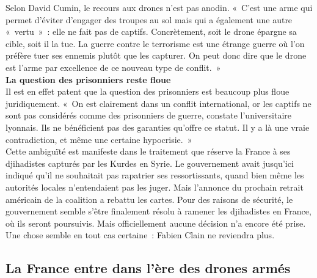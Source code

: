 \documentclass[8pt]{article}
\begin{document}
Selon David Cumin, le recours aux drones n’est pas anodin. «~C’est une arme qui permet d’éviter d’engager des troupes au sol mais qui a également une autre «~vertu~»~: elle ne fait pas de captifs. Concrètement, soit le drone épargne sa cible, soit il la tue. La guerre contre le terrorisme est une étrange guerre où l’on préfère tuer ses ennemis plutôt que les capturer. On peut donc dire que le drone est l’arme par excellence de ce nouveau type de conflit.~»\\

\textbf{La question des prisonniers reste floue}\\

Il est en effet patent que la question des prisonniers est beaucoup plus floue juridiquement. «~On est clairement dans un conflit international, or les captifs ne sont pas considérés comme des prisonniers de guerre, constate l’universitaire lyonnais. Ils ne bénéficient pas des garanties qu’offre ce statut. Il y a là une vraie contradiction, et même une certaine hypocrisie.~»\\

Cette ambiguïté est manifeste dans le traitement que réserve la France à ses djihadistes capturés par les Kurdes en Syrie. Le gouvernement avait jusqu’ici indiqué qu’il ne souhaitait pas rapatrier ses ressortissants, quand bien même les autorités locales n’entendaient pas les juger. Mais l’annonce du prochain retrait américain de la coalition a rebattu les cartes. Pour des raisons de sécurité, le gouvernement semble s’être finalement résolu à ramener les djihadistes en France, où ils seront poursuivis. Mais officiellement aucune décision n’a encore été prise. Une chose semble en tout cas certaine~: Fabien Clain ne reviendra plus.\\

\newpage
\subsection{La France entre dans l’ère des drones armés}
\label{sec:france_drone}
\end{document}

